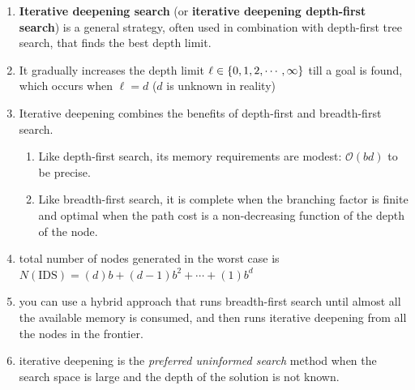 \begin{enumerate}[itemsep=0.2cm]
    \item \textbf{Iterative deepening search} (or \textbf{iterative deepening depth-first search}) is a general strategy, often used in combination with depth-first tree search, that finds the best depth limit.
    \hfill \cite{ai/book/Artificial-Intelligence-A-Modern-Approach/Russell-Norvig}

    \item It gradually increases the depth limit $\ell \in \left\{0,1,2,\cdots,\infty\right\}$ till a goal is found, which occurs when $\ell = d$ ($d$ is unknown in reality)
    \hfill \cite{ai/book/Artificial-Intelligence-A-Modern-Approach/Russell-Norvig}

    \item Iterative deepening combines the benefits of depth-first and breadth-first search.
    \hfill \cite{ai/book/Artificial-Intelligence-A-Modern-Approach/Russell-Norvig}
    \begin{enumerate}[itemsep=0.2cm]
        \item Like depth-first search, its memory requirements are modest: $\mathcal{O}(b d)$ to be precise. 
        \hfill \cite{ai/book/Artificial-Intelligence-A-Modern-Approach/Russell-Norvig}

        \item Like breadth-first search, it is complete when the branching factor is finite and optimal when the path cost is a non-decreasing function of the depth of the node.
        \hfill \cite{ai/book/Artificial-Intelligence-A-Modern-Approach/Russell-Norvig}
    \end{enumerate}

    \item total number of nodes generated in the worst case is
    \\
    $N(\text{IDS})=(d)b + (d - 1)b^2 + \cdots + (1)b^d$
    \hfill \cite{ai/book/Artificial-Intelligence-A-Modern-Approach/Russell-Norvig}

    \item you can use a hybrid approach that runs breadth-first search until almost all the available memory is consumed, and then runs iterative deepening from all the nodes in the frontier.
    \hfill \cite{ai/book/Artificial-Intelligence-A-Modern-Approach/Russell-Norvig}

    \item iterative deepening is the \textit{preferred uninformed search} method when the search space is large and the depth of the solution is not known.
    \hfill \cite{ai/book/Artificial-Intelligence-A-Modern-Approach/Russell-Norvig}


\end{enumerate}
